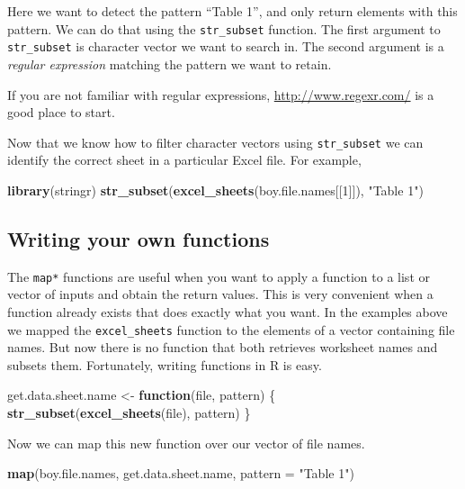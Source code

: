 \documentclass[]{book}
\newenvironment{Shaded}{\begin{snugshade}}{\end{snugshade}}
\newcommand{\KeywordTok}[1]{\textcolor[rgb]{0.13,0.29,0.53}{\textbf{#1}}}
\newcommand{\DataTypeTok}[1]{\textcolor[rgb]{0.13,0.29,0.53}{#1}}
\newcommand{\DecValTok}[1]{\textcolor[rgb]{0.00,0.00,0.81}{#1}}
\newcommand{\StringTok}[1]{\textcolor[rgb]{0.31,0.60,0.02}{#1}}
\newcommand{\ControlFlowTok}[1]{\textcolor[rgb]{0.13,0.29,0.53}{\textbf{#1}}}
\newcommand{\NormalTok}[1]{#1}
\begin{document}
Here we want to detect the pattern ``Table 1'', and only return elements
with this pattern. We can do that using the \texttt{str\_subset}
function. The first argument to \texttt{str\_subset} is character vector
we want to search in. The second argument is a \emph{regular expression}
matching the pattern we want to retain.

If you are not familiar with regular expressions,
\url{http://www.regexr.com/} is a good place to start.

Now that we know how to filter character vectors using
\texttt{str\_subset} we can identify the correct sheet in a particular
Excel file. For example,

\begin{Shaded}
\begin{Highlighting}[]
\KeywordTok{library}\NormalTok{(stringr)}
\KeywordTok{str_subset}\NormalTok{(}\KeywordTok{excel_sheets}\NormalTok{(boy.file.names[[}\DecValTok{1}\NormalTok{]]), }\StringTok{"Table 1"}\NormalTok{)}
\end{Highlighting}
\end{Shaded}

\subsection{Writing your own
functions}\label{writing-your-own-functions}

The \texttt{map*} functions are useful when you want to apply a function
to a list or vector of inputs and obtain the return values. This is very
convenient when a function already exists that does exactly what you
want. In the examples above we mapped the \texttt{excel\_sheets}
function to the elements of a vector containing file names. But now
there is no function that both retrieves worksheet names and subsets
them. Fortunately, writing functions in R is easy.

\begin{Shaded}
\begin{Highlighting}[]
\NormalTok{get.data.sheet.name <-}\StringTok{ }\ControlFlowTok{function}\NormalTok{(file, pattern) \{}
    \KeywordTok{str_subset}\NormalTok{(}\KeywordTok{excel_sheets}\NormalTok{(file), pattern)}
\NormalTok{\}}
\end{Highlighting}
\end{Shaded}

Now we can map this new function over our vector of file names.

\begin{Shaded}
\begin{Highlighting}[]
\KeywordTok{map}\NormalTok{(boy.file.names,}
\NormalTok{    get.data.sheet.name,}
    \DataTypeTok{pattern =} \StringTok{"Table 1"}\NormalTok{)}
\end{Highlighting}
\end{Shaded}
\end{document}
